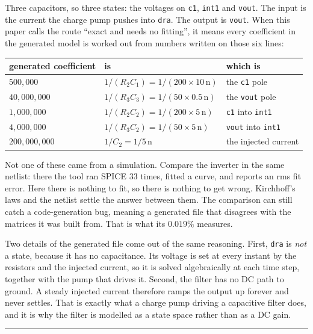 \documentclass[11pt,a4paper]{article}
\newcommand{\unit}[1]{\,\textrm{#1}}
\begin{document}
\noindent Three capacitors, so three states: the voltages on
\texttt{c1}, \texttt{int1} and \texttt{vout}. The input is the current
the charge pump pushes into \texttt{dra}. The output is \texttt{vout}.
When this paper calls the route ``exact and needs no fitting'', it
means every coefficient in the generated model is worked out from
numbers written on those six lines:

\begin{center}
\begin{tabular}{@{}lll@{}}
\toprule
\textbf{generated coefficient} & \textbf{is} & \textbf{which is} \\
\midrule
$500{,}000$      & $1/(R_2C_1) = 1/(200\times10\unit{n})$  & the \texttt{c1} pole \\
$40{,}000{,}000$ & $1/(R_3C_3) = 1/(50\times0.5\unit{n})$  & the \texttt{vout} pole \\
$1{,}000{,}000$  & $1/(R_2C_2) = 1/(200\times5\unit{n})$   & \texttt{c1} into \texttt{int1} \\
$4{,}000{,}000$  & $1/(R_3C_2) = 1/(50\times5\unit{n})$    & \texttt{vout} into \texttt{int1} \\
$200{,}000{,}000$& $1/C_2 = 1/5\unit{n}$                   & the injected current \\
\bottomrule
\end{tabular}
\end{center}

\noindent Not one of these came from a simulation. Compare the
inverter in the same netlist: there the tool ran SPICE $33$ times,
fitted a curve, and reports an rms fit error. Here there is nothing to
fit, so there is nothing to get wrong. Kirchhoff's laws and the
netlist settle the answer between them. The comparison can still catch
a code-generation bug, meaning a generated file that disagrees with the
matrices it was built from. That is what its $0.019\%$ measures.

Two details of the generated file come out of the same reasoning.
First, \texttt{dra} is \emph{not} a state, because it has no
capacitance. Its voltage is set at every instant by the resistors and
the injected current, so it is solved algebraically at each time step,
together with the pump that drives it. Second, the filter has no DC
path to ground. A steady injected current therefore ramps the output
up forever and never settles. That is exactly what a charge pump
driving a capacitive filter does, and it is why the filter is modelled
as a state space rather than as a DC gain.


\vspace{1.5em}
\noindent\rule{\linewidth}{0.4pt}
\vspace{0.3em}

\end{document}
